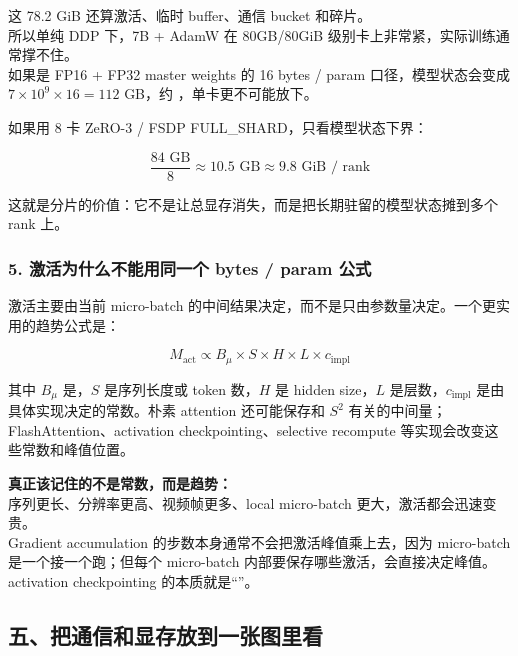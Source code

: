 \begin{warnbox}
这 78.2 GiB 还算激活、临时 buffer、通信 bucket 和碎片。\\
所以单纯 DDP 下，7B + AdamW 在 80GB/80GiB 级别卡上非常紧，实际训练通常撑不住。\\
如果是 FP16 + FP32 master weights 的 16 bytes / param 口径，模型状态会变成 $7 \times 10^9 \times 16 = 112$ GB，约 ，单卡更不可能放下。
\end{warnbox}

如果用 8 卡 ZeRO-3 / FSDP FULL\_SHARD，只看模型状态下界：

\[
\frac{84 \text{ GB}}{8}
\approx
10.5 \text{ GB}
\approx
9.8 \text{ GiB / rank}
\]

这就是分片的价值：它不是让总显存消失，而是把长期驻留的模型状态摊到多个 rank 上。

\subsubsection*{5. 激活为什么不能用同一个 bytes / param 公式}

激活主要由当前 micro-batch 的中间结果决定，而不是只由参数量决定。一个更实用的趋势公式是：

\[
M_{\text{act}}
\propto
B_{\mu} \times S \times H \times L \times c_{\text{impl}}
\]

其中 $B_{\mu}$ 是，$S$ 是序列长度或 token 数，$H$ 是 hidden size，$L$ 是层数，$c_{\text{impl}}$ 是由具体实现决定的常数。朴素 attention 还可能保存和 $S^2$ 有关的中间量；FlashAttention、activation checkpointing、selective recompute 等实现会改变这些常数和峰值位置。

\begin{warnbox}
\textbf{真正该记住的不是常数，而是趋势：}\\
序列更长、分辨率更高、视频帧更多、local micro-batch 更大，激活都会迅速变贵。\\
Gradient accumulation 的步数本身通常不会把激活峰值乘上去，因为 micro-batch 是一个接一个跑；但每个 micro-batch 内部要保存哪些激活，会直接决定峰值。activation checkpointing 的本质就是“”。
\end{warnbox}

\subsection{五、把通信和显存放到一张图里看}

